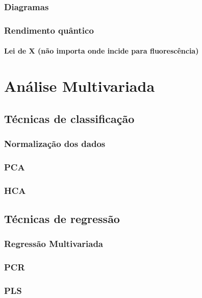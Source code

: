 			\subsection{Diagramas}
			\subsection{Rendimento quântico}
			\subsubsection{Lei de X (não importa onde incide para fluorescência)}
	\chapter{Análise Multivariada}
		\section{Técnicas de classificação}
			\subsection{Normalização dos dados}
			\subsection{PCA}
			\subsection{HCA}
		\section{Técnicas de regressão}
			\subsection{Regressão Multivariada}
			\subsection{PCR}
			\subsection{PLS}